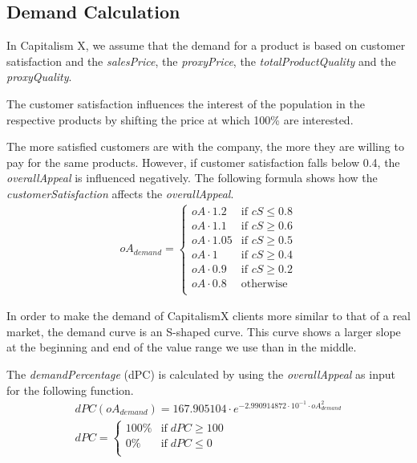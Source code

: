 \subsection{Demand Calculation} \label{demandCalc}

In Capitalism X, we assume that the demand for a product is based on customer satisfaction and the \textit{salesPrice}, the \textit{proxyPrice}, the \textit{totalProductQuality} and the \textit{proxyQuality}.

The customer satisfaction influences the interest of the population in the respective products by shifting the price at which 100\% are interested.
 
The more satisfied customers are with the company, the more they are willing to pay for the same products. However, if customer satisfaction falls below 0.4, the \textit{overallAppeal} is influenced negatively. The following formula shows how the \textit{customerSatisfaction} affects the \textit{overallAppeal}.
\begin{equation}
\label{func:demandPrice}
\begin{aligned}
 oA_{demand} = 
\begin{cases}
    oA \cdot 1.2 & \text{if } cS \leq 0.8 \\
    oA \cdot 1.1 & \text{if } cS \geq 0.6 \\
    oA \cdot 1.05 & \text{if } cS \geq 0.5 \\
    oA \cdot 1 & \text{if } cS \geq 0.4 \\
    oA \cdot 0.9 & \text{if } cS \geq 0.2 \\
    oA \cdot 0.8 & \text{otherwise} \\
\end{cases}
\end{aligned}
\end{equation}

In order to make the demand of CapitalismX clients more similar to that of a real market, the demand curve is an S-shaped curve. This curve shows a larger slope at the beginning and end of the value range we use than in the middle.

The \textit{demandPercentage} (\gls{dPC}) is calculated by using the \textit{overallAppeal} as input for the following function. 
\begin{equation}
\label{func:demandPercentage}
\begin{aligned}
dPC(oA_{demand}) = 167.905104 \cdot e^{−2.990914872 \cdot 10^{ -1 } \cdot oA_{demand}^{ 2 } } \\
dPC = 
    \begin{cases}
        100\% & \text{if} \; dPC \geq 100\\
        0\% & \text{if} \; dPC \leq 0\\
    \end{cases}
\end{aligned}
\end{equation}

